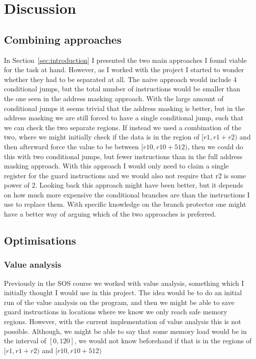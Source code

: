 \section{Discussion} \subsection{Combining approaches} In
Section~\ref{sec:introduction} I presented the two main approaches I found
viable for the task at hand. However, as I worked with the project I started to
wonder whether they had to be separated at all. The naive approach would
include 4 conditional jumps, but the total number of instructions would be
smaller than the one seen in the address masking approach. With the large
amount of conditional jumps it seems trivial that the address masking is
better, but in the address masking we are still forced to have a single
conditional jump, such that we can check the two separate regions. If instead
we used a combination of the two, where we might initially check if the data is
in the region of $[r1,r1 + r2)$ and then afterward force the value to be
between $[r10, r10 + 512)$, then we could do this with two conditional jumps,
but fewer instructions than in the full address masking approach. With this
approach I would only need to claim a single register for the guard
instructions and we would also not require that r2 is some power of 2. Looking
back this approach might have been better, but it depends on how much more
expensive the conditional branches are than the instructions I use to replace
them. With specific knowledge on the branch protector one might have a better
way of arguing which of the two approaches is preferred.

\subsection{Optimisations} \subsubsection{Value analysis} Previously in the SOS
course we worked with value analysis, something which I initially thought I
would use in this project. The idea would be to do an initial run of the value
analysis on the program, and then we might be able to save guard instructions
in locations where we know we only reach safe memory regions. However, with the
current implementation of value analysis this is not possible. Although, we
might be able to say that some memory load would be in the interval of $[0,
120]$, we would not know beforehand if that is in the regions of $[r1, r1+r2)$
and $[r10, r10+512)$

